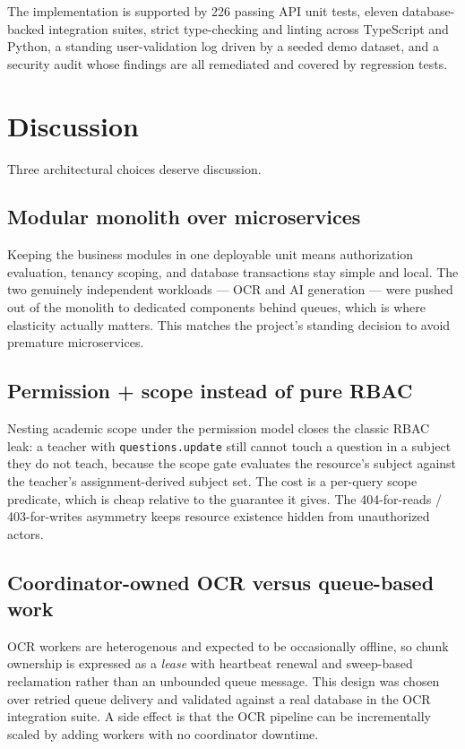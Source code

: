 \noindent The implementation is supported by 226 passing API unit tests,
eleven database-backed integration suites, strict type-checking and linting
across TypeScript and Python, a standing user-validation log driven by a
seeded demo dataset, and a security audit whose findings are all remediated
and covered by regression tests.

\section{Discussion}

\noindent Three architectural choices deserve discussion.

\subsection{Modular monolith over microservices}

Keeping the business modules in one deployable unit means authorization
evaluation, tenancy scoping, and database transactions stay simple and local.
The two genuinely independent workloads --- OCR and AI generation --- were
pushed out of the monolith to dedicated components behind queues, which is
where elasticity actually matters. This matches the project's standing
decision to avoid premature microservices.

\subsection{Permission + scope instead of pure RBAC}

Nesting academic scope under the permission model closes the classic RBAC
leak: a teacher with \texttt{questions.update} still cannot touch a question in
a subject they do not teach, because the scope gate evaluates the resource's
subject against the teacher's assignment-derived subject set. The cost is a
per-query scope predicate, which is cheap relative to the guarantee it gives.
The 404-for-reads / 403-for-writes asymmetry keeps resource existence hidden
from unauthorized actors.

\subsection{Coordinator-owned OCR versus queue-based work}

OCR workers are heterogenous and expected to be occasionally offline, so chunk
ownership is expressed as a \emph{lease} with heartbeat renewal and
sweep-based reclamation rather than an unbounded queue message. This design was
chosen over retried queue delivery and validated against a real database in
the OCR integration suite. A side effect is that the OCR pipeline can be
incrementally scaled by adding workers with no coordinator downtime.

